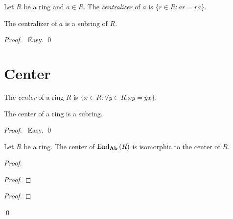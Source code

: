 \begin{df}[Centralizer]
Let $R$ be a ring and $a \in R$. The \emph{centralizer} of $a$ is $\{ r \in R : ar = ra \}$.
\end{df}

\begin{prop}
The centralizer of $a$ is a subring of $R$.
\end{prop}

\begin{proof}
\pf\ Easy. \qed
\end{proof}

\section{Center}

\begin{df}[Center]
The \emph{center} of a ring $R$ is $\{ x \in R : \forall y \in R. xy = yx \}$.
\end{df}

\begin{prop}
The center of a ring is a subring.
\end{prop}

\begin{proof}
\pf\ Easy. \qed
\end{proof}

\begin{prop}
Let $R$ be a ring. The center of $\mathrm{End}_{\mathbf{Ab}} \left( {R} \right)$ is isomorphic to the center of $R$.
\end{prop}

\begin{proof}
\pf
{}
\begin{proof}
\end{proof}
\begin{proof}
\end{proof}
\qed
\end{proof}

